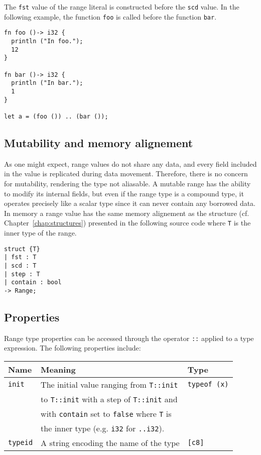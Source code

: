 The \texttt{fst} value of the range literal is constructed before the
\texttt{scd} value. In the following example, the function \texttt{foo} is
called before the function \texttt{bar}.

\begin{lstlisting}[style=coloredverbatim]
fn foo ()-> i32 {
  println ("In foo.");
  12
}

fn bar ()-> i32 {
  println ("In bar.");
  1
}

let a = (foo ()) .. (bar ());
\end{lstlisting}

\subsection {Mutability and memory alignement}

As one might expect, range values do not share any data, and every field
included in the value is replicated during data movement. Therefore, there is no
concern for mutability, rendering the type not aliasable. A mutable range has
the ability to modify its internal fields, but even if the range type is a
compound type, it operates precisely like a scalar type since it can never
contain any borrowed data. In memory a range value has the same memory
alignement as the structure (cf. Chapter~\ref{chap:structures}) presented in the
following source code where \texttt{T} is the inner type of the range.

\begin{lstlisting}[style=coloredverbatim]
struct {T}
| fst : T
| scd : T
| step : T
| contain : bool
-> Range;
\end{lstlisting}

\subsection {Properties}

Range type properties can be accessed through the operator \texttt{::} applied
to a type expression. The following properties include:

\begin{center}\begin{adjustbox}{max width=\linewidth}
  \begin{tabular}{|l|ll|}
    \hline
    Name & Meaning & Type\\
    \hline
    \hline
    \texttt{init} & The initial value ranging from \texttt{T::init} & \texttt{typeof (x)}\\
    & to \texttt{T::init} with a step of \texttt{T::init} and & \\
    & with \texttt{contain} set to \texttt{false} where \texttt{T} is & \\
    & the inner type (e.g. \texttt{i32} for \texttt{..i32}). &\\
    \hline
    \texttt{typeid} & A string encoding the name of the type & \texttt{[c8]} \\
    \hline
  \end{tabular}
\end{adjustbox}\end{center}


